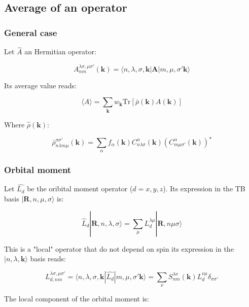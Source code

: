 \documentclass{article}
\newcommand{\bra}[1]{\langle #1|}
\newcommand{\ket}[1]{|#1\rangle}
\newcommand{\op}[1]{\hat{#1}}
\begin{document}
\noindent


\subsection{Average of an operator}

\subsubsection{General case}

\noindent
Let $\op{A}$ an Hermitian operator:

\[\displaystyle A_{nm}^{\lambda \sigma,\mu \sigma'}(\mathbf{k})=
\langle n,\lambda,\sigma,\mathbf{k}|{\bm A}| m,\mu,
\sigma'\mathbf{k}\rangle \]

\noindent
Its average value reads:

\[ \langle A \rangle =\sum_{\mathbf{k}} w_{\mathbf{k}} \text{Tr} \left[\bar{\rho}(\mathbf{k}) A(\mathbf{k}) \right] \]

\noindent
Where $\hat{\rho}(\mathbf{k})$:

\[ \bar{\rho}_{n \lambda m \mu}^{\sigma\sigma'}(\mathbf{k})=  \sum_{\alpha}  f_{\alpha}(\mathbf{k})
C_{n \lambda \sigma}^{\alpha}(\mathbf{k})(C_{m \mu \sigma'}^{\alpha}(\mathbf{k}))^{\star}    \]

\subsubsection{Orbital moment}

\noindent
Let $\op{L_{d}}$ be the oribital moment operator ($d=x,y,z$). Its expression in the TB basis $\ket{\mathbf{R},n,\mu,\sigma}$ is:

\[ \op{L}_{d} \ket{\mathbf{R},n,\lambda,\sigma} = \sum_{\mu} L_{d}^{\lambda\mu}\ket{\mathbf{R},n \mu \sigma} \]


\noindent
This is a "local" operator that do not depend on spin
its expression in the $\ket{n,\lambda,\mathbf{k}}$ basis reads:

\[ L_{d ,n m}^{\lambda \sigma, \mu \sigma'}= 
\bra{ n,\lambda,\sigma,\mathbf{k}}\op{L_{d}}\ket{ m,\mu, \sigma'\mathbf{k}}=
\sum_{\nu} S_{nm}^{\lambda\nu}(\mathbf{k})L_{d}^{\nu\mu} \delta_{\sigma \sigma'}
 \]

 \noindent
The local component of the orbital moment is:
\end{document}
